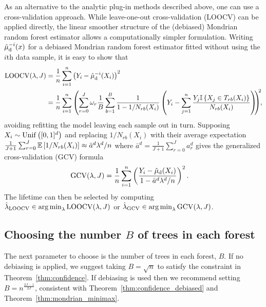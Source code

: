 As an alternative to the analytic plug-in methods described above,
one can use a cross-validation approach.
While leave-one-out cross-validation (LOOCV) can be applied directly,
the linear smoother structure of the (debiased) Mondrian random forest
estimator allows a computationally simpler formulation.
Writing $\hat\mu_{\mathrm{d}}^{-i}(x)$ for a debiased Mondrian random
forest estimator fitted without using the $i$th data sample,
it is easy to show that
%
\begin{align*}
  \operatorname{LOOCV}(\lambda, J)
  &=
  \frac{1}{n}
  \sum_{i=1}^{n}
  \left( Y_i - \hat\mu_{\mathrm{d}}^{-i}(X_i) \right)^2 \\
  &=
  \frac{1}{n}
  \sum_{i=1}^{n}
  \left(
    \sum_{r=0}^{J}
    \omega_r
    \frac{1}{B}
    \sum_{b=1}^{B}
    \frac{1}{1 - 1/N_{r b}(X_i)}
    \left( Y_i -
      \sum_{j=1}^{n}
      \frac{ Y_j \mathbb{I} \left\{ X_j \in T_{r b}(X_i) \right\}}
      {N_{r b}(X_i)}
    \right)
    \hspace*{-1mm}
  \right)^{\hspace*{-1mm}2}
  \hspace*{-1.2mm},
\end{align*}
%
avoiding refitting the model leaving each sample out in turn.
Supposing $X_i \sim \operatorname{Unif}\big([0,1]^d\big)$ and
replacing $1/N_{r b}(X_i)$ with their average expectation
$ \frac{1}{J+1}
\sum_{r=0}^{J}
\mathbb{E} \left[ 1/N_{r b}(X_i) \right]
\approx \bar a^d \lambda^d / n$
where
$\bar a^d = \frac{1}{J+1} \sum_{r=0}^{J} a_r^d$
gives the generalized cross-validation (GCV) formula
%
\begin{align*}
  \operatorname{GCV}(\lambda, J)
  &=
  \frac{1}{n}
  \sum_{i=1}^{n}
  \left(
    \frac{Y_i - \hat\mu_{\mathrm{d}}(X_i)}
    {1 - \bar a^d \lambda^d / n}
  \right)^2.
\end{align*}
%
The lifetime can then be selected by computing
$\hat\lambda_{\operatorname{LOOCV}} \in \operatorname*{arg\,min}_\lambda \operatorname{LOOCV}(\lambda, J)$
or
$\hat\lambda_{\operatorname{GCV}} \in \operatorname*{arg\,min}_\lambda \operatorname{GCV}(\lambda, J)$.

\subsection{Choosing the number \texorpdfstring{$B$}{B} of trees
in each forest}%

The next parameter to choose is the number of trees in each forest, $B$.
If no debiasing is applied, we suggest taking
$B = \sqrt{n}$ to satisfy the constraint in Theorem~\ref{thm:confidence}.
If debiasing is used then we recommend setting
$B = n^{\frac{2J-1}{2J}}$,
consistent with Theorem~\ref{thm:confidence_debiased}
and Theorem~\ref{thm:mondrian_minimax}.

